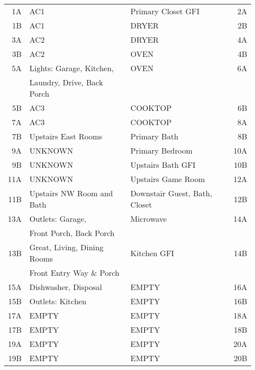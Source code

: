 \documentclass[]{article}
\begin{document}
\begin{tabular}[]{rllr}
1A  & AC1                         & Primary Closet GFI                  & 2A \\
1B  & AC1                         & DRYER                               & 2B \\ \hline
3A  & AC2                         & DRYER                               & 4A \\
3B  & AC2                         & OVEN                                & 4B \\ \hline
5A  & Lights: Garage, Kitchen,    & OVEN                                & 6A \\
    & Laundry, Drive, Back Porch  &                                     & \\
5B  & AC3                         & COOKTOP                             & 6B \\ \hline
7A  & AC3                         & COOKTOP                             & 8A \\
7B  & Upstairs East Rooms         & Primary Bath                        & 8B \\ \hline
9A  & UNKNOWN                     & Primary Bedroom                     & 10A \\
9B  & UNKNOWN                     & Upstairs Bath GFI                   & 10B \\ \hline
11A & UNKNOWN                     & Upstairs Game Room                  & 12A \\
11B & Upstairs NW Room and Bath   & Downstair Guest, Bath, Closet       & 12B \\ \hline
13A & Outlets: Garage,            & Microwave                           & 14A \\
    & Front Porch, Back Porch     &                                     &     \\ \hline
13B & Great, Living, Dining Rooms & Kitchen GFI                         & 14B \\
    & Front Entry Way \& Porch    &                                     & \\     \hline
15A & Dishwasher, Disposal        & EMPTY                               & 16A \\
15B & Outlets: Kitchen            & EMPTY                               & 16B \\ \hline
17A & EMPTY                       & EMPTY                               & 18A \\
17B & EMPTY                       & EMPTY                               & 18B \\ \hline
19A & EMPTY                       & EMPTY                               & 20A \\
19B & EMPTY                       & EMPTY                               & 20B \\
\end{tabular}
\end{document}
